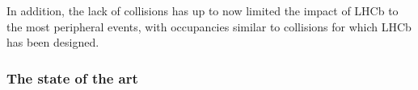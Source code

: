 \documentclass[a4paper,11pt]{article}
\begin{document}
In addition, the lack of \PbPb collisions has up to now limited the impact of LHCb to the most peripheral events, with occupancies similar to \pp collisions for which LHCb has been designed.








\subsubsection{The state of the art} \label{sec:stateoftheart}
\end{document}
